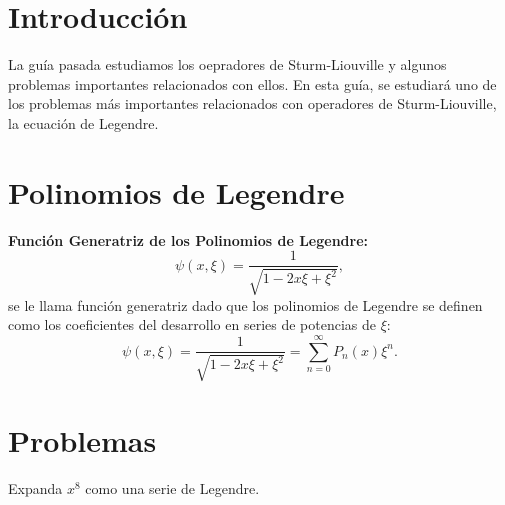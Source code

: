 \section*{Introducción}
La guía pasada estudiamos los oepradores de Sturm-Liouville y algunos problemas importantes relacionados con ellos. En esta guía, se estudiará uno de los problemas más importantes relacionados con operadores de Sturm-Liouville, la ecuación de Legendre.


\section*{Polinomios de Legendre}


\begin{mdframed}[style=warning]
	{\Large \textbf{Función Generatriz de los Polinomios de Legendre:}} \\
		$$ \psi (x,\xi) = \frac{1}{\sqrt{1 - 2x\xi + \xi ^2}}, $$
	se le llama función generatriz dado que los polinomios de Legendre se definen como los coeficientes del desarrollo en series de potencias de $\xi$:
		\begin{equation}
			\psi (x,\xi) = \frac{1}{\sqrt{1 - 2x\xi + \xi ^2}} = \sum _{n = 0} ^\infty P_n (x) \xi ^n . \label{generatriz}
		\end{equation}
\end{mdframed}












\pagebreak


\section*{Problemas}






\begin{ejercicio}
	Expanda $x^8$ como una serie de Legendre.
\end{ejercicio}


















